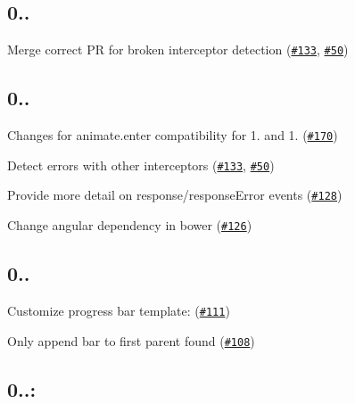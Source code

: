 \subsection*{0..}


\begin{DoxyItemize}
\item Merge correct PR for broken interceptor detection (\href{https://github.com/chieffancypants/angular-loading-bar/pull/133}{\tt \#133}, \href{https://github.com/chieffancypants/angular-loading-bar/pull/50}{\tt \#50})
\end{DoxyItemize}

\subsection*{0..}


\begin{DoxyItemize}
\item Changes for animate.\+enter compatibility for 1. and 1. (\href{https://github.com/chieffancypants/angular-loading-bar/pull/170}{\tt \#170})
\item Detect errors with other interceptors (\href{https://github.com/chieffancypants/angular-loading-bar/pull/133}{\tt \#133}, \href{https://github.com/chieffancypants/angular-loading-bar/pull/50}{\tt \#50})
\item Provide more detail on response/response\+Error events (\href{https://github.com/chieffancypants/angular-loading-bar/pull/128}{\tt \#128})
\item Change angular dependency in bower (\href{https://github.com/chieffancypants/angular-loading-bar/issues/126}{\tt \#126})
\end{DoxyItemize}

\subsection*{0..}


\begin{DoxyItemize}
\item Customize progress bar template\+: (\href{https://github.com/chieffancypants/angular-loading-bar/pull/111}{\tt \#111})
\item Only append bar to first parent found (\href{https://github.com/chieffancypants/angular-loading-bar/pull/108}{\tt \#108})
\end{DoxyItemize}

\subsection*{0..\+:}

